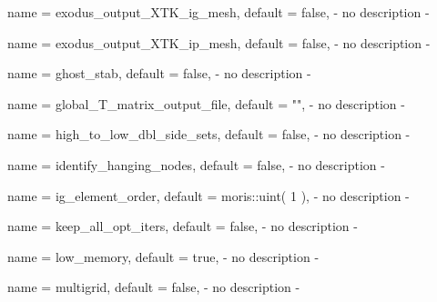 \begin{parameter}{
    name    = {exodus_output_XTK_ig_mesh},
    default = {false},
}
- no description -
\end{parameter}

\begin{parameter}{
    name    = {exodus_output_XTK_ip_mesh},
    default = {false},
}
- no description -
\end{parameter}

\begin{parameter}{
    name    = {ghost_stab},
    default = {false},
}
- no description -
\end{parameter}

\begin{parameter}{
    name    = {global_T_matrix_output_file},
    default = {""},
}
- no description -
\end{parameter}

\begin{parameter}{
    name    = {high_to_low_dbl_side_sets},
    default = {false},
}
- no description -
\end{parameter}

\begin{parameter}{
    name    = {identify_hanging_nodes},
    default = {false},
}
- no description -
\end{parameter}

\begin{parameter}{
    name    = {ig_element_order},
    default = {moris::uint( 1 )},
}
- no description -
\end{parameter}

\begin{parameter}{
    name    = {keep_all_opt_iters},
    default = {false},
}
- no description -
\end{parameter}

\begin{parameter}{
    name    = {low_memory},
    default = {true},
}
- no description -
\end{parameter}

\begin{parameter}{
    name    = {multigrid},
    default = {false},
}
- no description -
\end{parameter}

